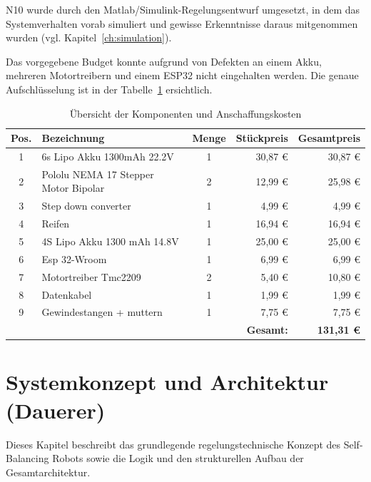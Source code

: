 \documentclass[fontsize=12pt,
parskip=half,	%
department=FakM,  %
logostyle=flat,
twoside, %
DIV=15,BCOR=10mm, %
]{OTHRreprt}
\begin{document}
N10 wurde durch den Matlab/Simulink-Regelungsentwurf umgesetzt, in dem das Systemverhalten vorab simuliert und gewisse Erkenntnisse daraus mitgenommen wurden (vgl. Kapitel~\ref{ch:simulation}). 

Das vorgegebene Budget konnte aufgrund von Defekten an einem Akku, mehreren Motortreibern und einem ESP32 nicht eingehalten werden. Die genaue Aufschlüsselung ist in der Tabelle~\ref{tab:komponenten_kosten} ersichtlich. 

\begin{table}[h]
    \centering
    \caption{Übersicht der Komponenten und Anschaffungskosten}
    \label{tab:komponenten_kosten}
    \begin{tabular}{|c|l|c|r|r|}
        \hline
        \textbf{Pos.} & \textbf{Bezeichnung} & \textbf{Menge} & \textbf{Stückpreis} & \textbf{Gesamtpreis} \\
        \hline
        1 & 6s Lipo Akku 1300mAh 22.2V & 1 & 30,87 € & 30,87 € \\
        \hline
        2 & Pololu NEMA 17 Stepper Motor Bipolar & 2 & 12,99 € & 25,98 € \\
        \hline
        3 & Step down converter & 1 & 4,99 € & 4,99 € \\
        \hline
        4 & Reifen & 1 & 16,94 € & 16,94 € \\
        \hline
        5 & 4S Lipo Akku 1300 mAh 14.8V & 1 & 25,00 € & 25,00 € \\
        \hline
        6 & Esp 32-Wroom & 1 & 6,99 € & 6,99 € \\
        \hline
        7 & Motortreiber Tmc2209 & 2 & 5,40 € & 10,80 € \\
        \hline
        8 & Datenkabel & 1 & 1,99 € & 1,99 € \\
        \hline
        9 & Gewindestangen + muttern & 1 & 7,75 € & 7,75 € \\
        \hline
        \multicolumn{3}{|l|}{} & \textbf{Gesamt:} & \textbf{131,31 €} \\
        \hline
    \end{tabular}
\end{table}

\chapter{Systemkonzept und Architektur (Dauerer)}
\label{ch:systemkonzept}

Dieses Kapitel beschreibt das grundlegende regelungstechnische Konzept des Self-Balancing Robots 
sowie die Logik und den strukturellen Aufbau der Gesamtarchitektur.
\end{document}
